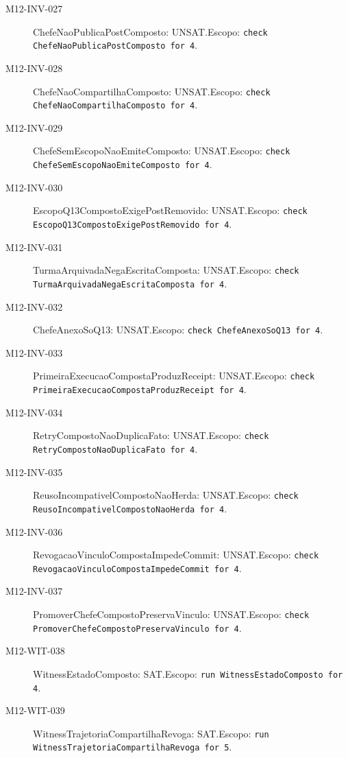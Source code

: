 \begin{description}
\item[M12-INV-027] ChefeNaoPublicaPostComposto: UNSAT.\newline Escopo: \texttt{check ChefeNaoPublicaPostComposto for 4}.
\item[M12-INV-028] ChefeNaoCompartilhaComposto: UNSAT.\newline Escopo: \texttt{check ChefeNaoCompartilhaComposto for 4}.
\item[M12-INV-029] ChefeSemEscopoNaoEmiteComposto: UNSAT.\newline Escopo: \texttt{check ChefeSemEscopoNaoEmiteComposto for 4}.
\item[M12-INV-030] EscopoQ13CompostoExigePostRemovido: UNSAT.\newline Escopo: \texttt{check EscopoQ13CompostoExigePostRemovido for 4}.
\item[M12-INV-031] TurmaArquivadaNegaEscritaComposta: UNSAT.\newline Escopo: \texttt{check TurmaArquivadaNegaEscritaComposta for 4}.
\item[M12-INV-032] ChefeAnexoSoQ13: UNSAT.\newline Escopo: \texttt{check ChefeAnexoSoQ13 for 4}.
\item[M12-INV-033] PrimeiraExecucaoCompostaProduzReceipt: UNSAT.\newline Escopo: \texttt{check PrimeiraExecucaoCompostaProduzReceipt for 4}.
\item[M12-INV-034] RetryCompostoNaoDuplicaFato: UNSAT.\newline Escopo: \texttt{check RetryCompostoNaoDuplicaFato for 4}.
\item[M12-INV-035] ReusoIncompativelCompostoNaoHerda: UNSAT.\newline Escopo: \texttt{check ReusoIncompativelCompostoNaoHerda for 4}.
\item[M12-INV-036] RevogacaoVinculoCompostaImpedeCommit: UNSAT.\newline Escopo: \texttt{check RevogacaoVinculoCompostaImpedeCommit for 4}.
\item[M12-INV-037] PromoverChefeCompostoPreservaVinculo: UNSAT.\newline Escopo: \texttt{check PromoverChefeCompostoPreservaVinculo for 4}.
\item[M12-WIT-038] WitnessEstadoComposto: SAT.\newline Escopo: \texttt{run WitnessEstadoComposto for 4}.
\item[M12-WIT-039] WitnessTrajetoriaCompartilhaRevoga: SAT.\newline Escopo: \texttt{run WitnessTrajetoriaCompartilhaRevoga for 5}.

\end{description}

